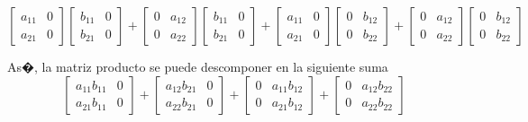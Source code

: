 \documentclass{article}
\begin{document}
$$
	\left[
	\begin{array}{cc}
		a_{11} & 0 \\
		a_{21} & 0
	\end{array}
	\right]
	\left[
	\begin{array}{cc}
		b_{11} & 0 \\
		b_{21} & 0
	\end{array}
	\right]
        +
	\left[
	\begin{array}{cc}
		0 & a_{12} \\
		0 & a_{22}
	\end{array}
	\right]
	\left[
	\begin{array}{cc}
		b_{11} & 0 \\
		b_{21} & 0
	\end{array}
	\right]
	+
	\left[
	\begin{array}{cc}
		a_{11} & 0 \\
		a_{21} & 0
	\end{array}
	\right]
	\left[
	\begin{array}{cc}
		0 & b_{12} \\
		0 & b_{22}
	\end{array}
	\right]
        +
	\left[
	\begin{array}{cc}
		0 & a_{12} \\
		0 & a_{22}
	\end{array}
	\right]
	\left[
	\begin{array}{cc}
		0 & b_{12} \\
		0 & b_{22}
	\end{array}
	\right]
$$

As�, la matriz producto se puede descomponer en la siguiente suma
$$
	\left[
	\begin{array}{cc}
		a_{11} b_{11} & 0 \\
		a_{21} b_{11} & 0
	\end{array}
	\right]
        +
	\left[
	\begin{array}{cc}
		a_{12} b_{21} & 0 \\
		a_{22} b_{21} & 0
	\end{array}
	\right]
	+
	\left[
	\begin{array}{cc}
		0 & a_{11} b_{12} \\
		0 & a_{21} b_{12}
	\end{array}
	\right]
        +
	\left[
	\begin{array}{cc}
		0 & a_{12} b_{22} \\
		0 & a_{22} b_{22}
	\end{array}
	\right]
$$
\end{document}
